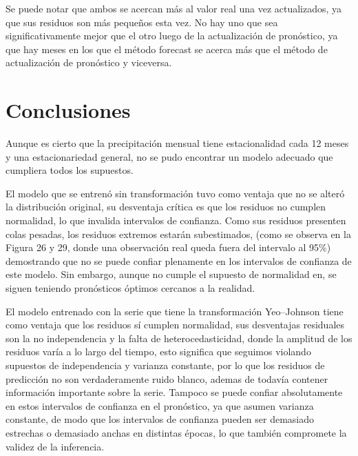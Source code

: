\documentclass[12pt,letterpaper]{article}   %
\begin{document}
Se puede notar que ambos se acercan más al valor real una vez actualizados, ya que sus residuos son más pequeños esta vez. No hay uno que sea significativamente mejor que el otro luego de la actualización de pronóstico, ya que hay meses en los que el método forecast se acerca más que el método de actualización de pronóstico y viceversa.








































\newpage
\section{Conclusiones}

Aunque es cierto que la precipitación mensual tiene estacionalidad cada 12 meses y una estacionariedad general, no se pudo encontrar un modelo adecuado que cumpliera todos los supuestos.

 El modelo que se entrenó sin transformación tuvo como ventaja que no se alteró la distribución original, su desventaja crítica es que los residuos no cumplen normalidad, lo que invalida intervalos de confianza. Como sus residuos presenten colas pesadas, los residuos extremos estarán subestimados, (como se observa en la Figura 26 y 29, donde una observación real queda fuera del intervalo al 95\%) demostrando que no se puede confiar plenamente en los intervalos de confianza de este modelo. Sin embargo, aunque no cumple el supuesto de normalidad en, se siguen teniendo pronósticos óptimos cercanos a la realidad.
 
 El modelo entrenado con la serie que tiene la transformación Yeo–Johnson tiene como ventaja que los residuos sí cumplen normalidad, sus desventajas residuales son la no independencia y la falta de heterocedasticidad, donde la amplitud de los residuos varía a lo largo del tiempo, esto significa que seguimos violando supuestos de independencia y varianza constante, por lo que los residuos de predicción no son verdaderamente ruido blanco, ademas de todavía contener información importante sobre la serie. Tampoco se puede confiar absolutamente en estos intervalos de confianza en el pronóstico, ya que asumen varianza constante, de modo que los intervalos de confianza pueden ser demasiado estrechas o demasiado anchas en distintas épocas, lo que también compromete la validez de la inferencia. 
\end{document}
